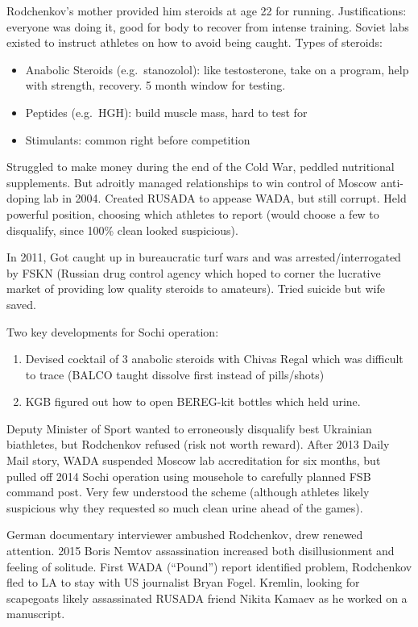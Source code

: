 \documentclass[
]{article}
\begin{document}
Rodchenkov's mother provided him steroids at age 22 for running.
Justifications: everyone was doing it, good for body to recover from
intense training. Soviet labs existed to instruct athletes on how to
avoid being caught. Types of steroids:

\begin{itemize}
\item
  Anabolic Steroids (e.g.~stanozolol): like testosterone, take on a
  program, help with strength, recovery. 5 month window for testing.
\item
  Peptides (e.g.~HGH): build muscle mass, hard to test for
\item
  Stimulants: common right before competition
\end{itemize}

Struggled to make money during the end of the Cold War, peddled
nutritional supplements. But adroitly managed relationships to win
control of Moscow anti-doping lab in 2004. Created RUSADA to appease
WADA, but still corrupt. Held powerful position, choosing which athletes
to report (would choose a few to disqualify, since 100\% clean looked
suspicious).

In 2011, Got caught up in bureaucratic turf wars and was
arrested/interrogated by FSKN (Russian drug control agency which hoped
to corner the lucrative market of providing low quality steroids to
amateurs). Tried suicide but wife saved.

Two key developments for Sochi operation:

\begin{enumerate}
\def\labelenumi{\arabic{enumi}.}
\item
  Devised cocktail of 3 anabolic steroids with Chivas Regal which was
  difficult to trace (BALCO taught dissolve first instead of
  pills/shots)
\item
  KGB figured out how to open BEREG-kit bottles which held urine.
\end{enumerate}

Deputy Minister of Sport wanted to erroneously disqualify best Ukrainian
biathletes, but Rodchenkov refused (risk not worth reward). After 2013
Daily Mail story, WADA suspended Moscow lab accreditation for six
months, but pulled off 2014 Sochi operation using mousehole to carefully
planned FSB command post. Very few understood the scheme (although
athletes likely suspicious why they requested so much clean urine ahead
of the games).

German documentary interviewer ambushed Rodchenkov, drew renewed
attention. 2015 Boris Nemtov assassination increased both
disillusionment and feeling of solitude. First WADA (``Pound'') report
identified problem, Rodchenkov fled to LA to stay with US journalist
Bryan Fogel. Kremlin, looking for scapegoats likely assassinated RUSADA
friend Nikita Kamaev as he worked on a manuscript.
\end{document}
